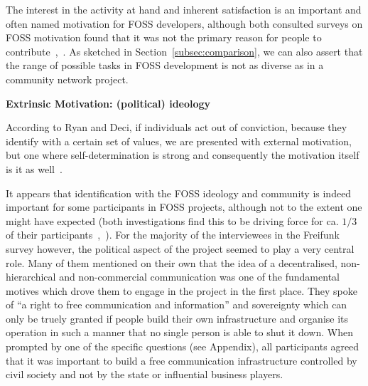 The interest in the activity at hand and inherent satisfaction is an important and often named motivation for FOSS developers, although both consulted surveys on FOSS motivation found that it was not the primary reason for people to contribute~\cite{HarOu2002},~\cite{LakWo2005}.
As sketched in Section~\ref{subsec:comparison}, we can also assert that the range of possible tasks in FOSS development is not as diverse as in a community network project.

\textbf{Extrinsic Motivation: (political) ideology}

According to Ryan and Deci, if individuals act out of conviction, because they identify with a certain set of values, we are presented with external motivation, but one where self-determination is strong and consequently the motivation itself is it as well~\cite{RyDe2000}.

It appears that identification with the FOSS ideology and community is indeed important for some participants in FOSS projects, although not to the extent one might have expected (both investigations find this to be driving force for ca. $1/3$ of their participants~\cite{HarOu2002},~\cite{LakWo2005}).
For the majority of the interviewees in the Freifunk survey however, the political aspect of the project seemed to play a very central role.
Many of them mentioned on their own that the idea of a decentralised, non-hierarchical and non-commercial communication was one of the fundamental motives which drove them to engage in the project in the first place.
They spoke of ``a right to free communication and information'' and sovereignty which can only be truely granted if people build their own infrastructure and organise its operation in such a manner that no single person is able to shut it down.
When prompted by one of the specific questions (see Appendix), all participants agreed that it was important to build a free communication infrastructure controlled by civil society and not by the state or influential business players.

